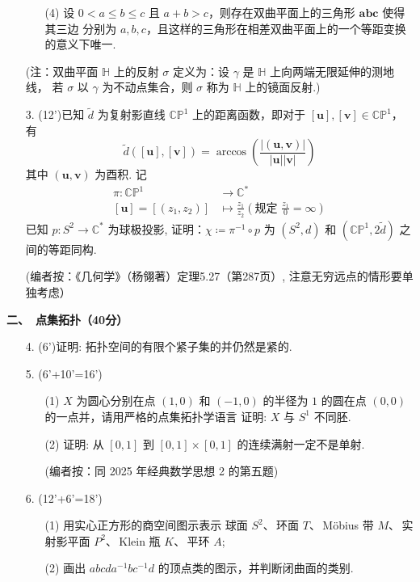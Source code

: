 \begin{itemize}
\begin{enumerate}
\item[(4)]设 $0<a\leq b\leq c$ 且 $a+b>c$，则存在双曲平面上的三角形 $\boldsymbol{a}\boldsymbol{b}\boldsymbol{c}$ 使得其三边
分别为 $a,b,c$，且这样的三角形在相差双曲平面上的一个等距变换的意义下唯一.
\end{enumerate}
(注：双曲平面 $\mathbb{H}$ 上的反射 $\sigma$ 定义为：设 $\gamma$ 是 $\mathbb{H}$ 上向两端无限延伸的测地线，
若 $\sigma$ 以 $\gamma$ 为不动点集合，则 $\sigma$ 称为 $\mathbb{H}$ 上的镜面反射.)
\item[3.](12')已知 $\tilde{d}$ 为复射影直线 $\mathbb{CP}^{1}$ 上的距离函数，即对于 $[\boldsymbol{u}],[\boldsymbol{v}]\in\mathbb{CP}^{1}$，
有 
\[
\tilde{d}\left( [\boldsymbol{u}],[\boldsymbol{v}] \right)=\arccos\left( \frac{\left| (\boldsymbol{u},\boldsymbol{v}) \right|}{\left| \boldsymbol{u} \right|\left| \boldsymbol{v} \right|} \right)
\]
其中 $(\boldsymbol{u},\boldsymbol{v})$ 为酉积. 记 
\[
\begin{aligned}
\pi: \mathbb{CP}^{1}&\rightarrow\mathbb{C}^{\ast}\\
[\boldsymbol{u}]=[(z_1,z_2)]&\mapsto \frac{z_1}{z_2} \left( \text{规定 } \frac{z_1}{0}=\infty \right)
\end{aligned}
\] 
已知 $p: S^2\rightarrow \mathbb{C}^{\ast}$ 为球极投影, 证明：$\chi\coloneqq\pi^{-1}\circ p$ 为 $(S^2,d)$ 和 $(\mathbb{CP}^{1},2\tilde{d})$ 之间的等距同构.

(编者按：《几何学》（杨翎著）定理5.27（第287页）, 注意无穷远点的情形要单独考虑）
\end{itemize}

\textbf{二、\ 点集拓扑（40分）}
\begin{itemize}
\item[4.](6')证明: 拓扑空间的有限个紧子集的并仍然是紧的.
\item[5.](6'+10'=16')
\begin{enumerate}
\item[(1)]$X$ 为圆心分别在点 $(1,0)$ 和 $(-1,0)$ 的半径为 $1$ 的圆在点 $(0,0)$ 的一点并，请用严格的点集拓扑学语言
证明: $X$ 与 $S^1$ 不同胚.
\item[(2)]证明: 从 $[0,1]$ 到 $[0,1]\times[0,1]$ 的连续满射一定不是单射. 

(编者按：同 2025 年经典数学思想 2 的第五题)
\end{enumerate}
\item[6.](12'+6'=18')
\begin{enumerate}
\item[(1)]用实心正方形的商空间图示表示
球面 $S^2$、\,环面 $T$、\,Möbius 带 $M$、\,实射影平面 $P^2$、\,Klein 瓶 $K$、\,平环 $A$;
\item[(2)]画出 $abcda^{-1}bc^{-1}d$ 的顶点类的图示，并判断闭曲面的类别.
\end{enumerate}
\end{itemize}

